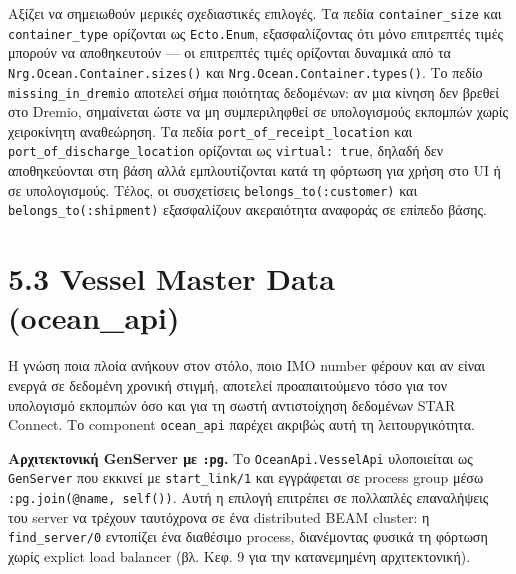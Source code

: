 \begin{Shaded}
\begin{Highlighting}[]
\FunctionTok{(}\NormalTok{, }\FunctionTok{)}
\FunctionTok{(}\NormalTok{, }\FunctionTok{)}

\FunctionTok{(}\NormalTok{, }\NormalTok{, } \FunctionTok{)}
\FunctionTok{(}\NormalTok{, }\NormalTok{, } \FunctionTok{)}
\end{Highlighting}
\end{Shaded}

Αξίζει να σημειωθούν μερικές σχεδιαστικές επιλογές. Τα πεδία
\texttt{container\_size} και \texttt{container\_type} ορίζονται ως
\texttt{Ecto.Enum}, εξασφαλίζοντας ότι μόνο επιτρεπτές τιμές μπορούν να
αποθηκευτούν --- οι επιτρεπτές τιμές ορίζονται δυναμικά από τα
\texttt{Nrg.Ocean.Container.sizes()} και
\texttt{Nrg.Ocean.Container.types()}. Το πεδίο
\texttt{missing\_in\_dremio} αποτελεί σήμα ποιότητας δεδομένων: αν μια
κίνηση δεν βρεθεί στο Dremio, σημαίνεται ώστε να μη συμπεριληφθεί σε
υπολογισμούς εκπομπών χωρίς χειροκίνητη αναθεώρηση. Τα πεδία
\texttt{port\_of\_receipt\_location} και
\texttt{port\_of\_discharge\_location} ορίζονται ως
\texttt{virtual:\ true}, δηλαδή δεν αποθηκεύονται στη βάση αλλά
εμπλουτίζονται κατά τη φόρτωση για χρήση στο UI ή σε υπολογισμούς.
Τέλος, οι συσχετίσεις \texttt{belongs\_to(:customer)} και
\texttt{belongs\_to(:shipment)} εξασφαλίζουν ακεραιότητα αναφοράς σε
επίπεδο βάσης.

\section{5.3 Vessel Master Data
(ocean\_api)}\label{vessel-master-data-ocean_api}

Η γνώση ποια πλοία ανήκουν στον στόλο, ποιο IMO number φέρουν και αν
είναι ενεργά σε δεδομένη χρονική στιγμή, αποτελεί προαπαιτούμενο τόσο
για τον υπολογισμό εκπομπών όσο και για τη σωστή αντιστοίχηση δεδομένων
STAR Connect. Το component \texttt{ocean\_api} παρέχει ακριβώς αυτή τη
λειτουργικότητα.

\textbf{Αρχιτεκτονική GenServer με \texttt{:pg}.} Το
\texttt{OceanApi.VesselApi} υλοποιείται ως \texttt{GenServer} που
εκκινεί με \texttt{start\_link/1} και εγγράφεται σε process group μέσω
\texttt{:pg.join(@name,\ self())}. Αυτή η επιλογή επιτρέπει σε πολλαπλές
επαναλήψεις του server να τρέχουν ταυτόχρονα σε ένα distributed BEAM
cluster: η \texttt{find\_server/0} εντοπίζει ένα διαθέσιμο process,
διανέμοντας φυσικά τη φόρτωση χωρίς explict load balancer (βλ. Κεφ. 9
για την κατανεμημένη αρχιτεκτονική).

